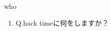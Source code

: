 \begin{prework}{ who }
  \begin{enumerate}
  \item Q.hack timeに何をしますか？
  \end{enumerate}
\end{prework}
